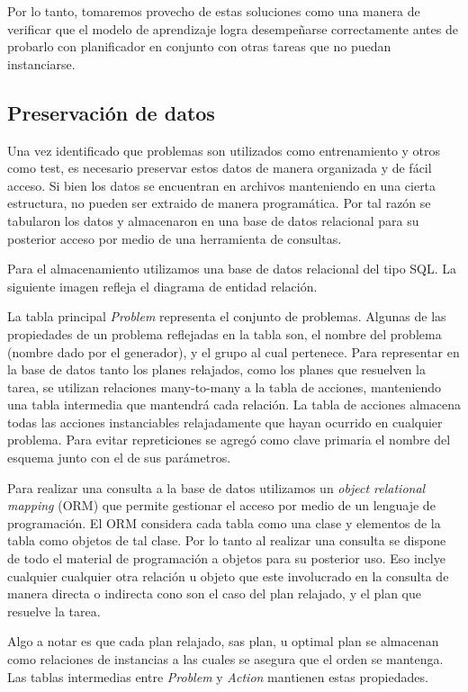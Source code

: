 Por lo tanto, tomaremos provecho de estas soluciones como una manera de
verificar que el modelo de aprendizaje logra desempeñarse correctamente antes de
probarlo con planificador en conjunto con otras tareas que no puedan
instanciarse.

\subsection{Preservación de datos}

Una vez identificado que problemas son utilizados como entrenamiento y otros
como test, es necesario preservar estos datos de manera organizada y de fácil
acceso. Si bien los datos se encuentran en archivos manteniendo en una cierta
estructura, no pueden ser extraido de manera programática. Por tal razón se
tabularon los datos y almacenaron en una base de datos relacional para su
posterior acceso por medio de una herramienta de consultas.

Para el almacenamiento utilizamos una base de datos relacional del tipo SQL. La
siguiente imagen refleja el diagrama de entidad relación.

La tabla principal \emph{Problem} representa el conjunto de problemas. Algunas
de las propiedades de un problema reflejadas en la tabla son, el nombre del
problema (nombre dado por el generador), y el grupo al cual pertenece. Para
representar en la base de datos tanto los planes relajados, como los planes que
resuelven la tarea, se utilizan relaciones many-to-many a la tabla de acciones,
manteniendo una tabla intermedia que mantendrá cada relación. La tabla de
acciones almacena todas las acciones instanciables relajadamente que hayan
ocurrido en cualquier problema. Para evitar repreticiones se agregó como clave
primaria el nombre del esquema junto con el de sus parámetros.

Para realizar una consulta a la base de datos utilizamos un \emph{object
relational mapping} (ORM) que permite gestionar el acceso por medio de un
lenguaje de programación. El ORM considera cada tabla como una clase y elementos
de la tabla como objetos de tal clase. Por lo tanto al realizar una consulta se
dispone de todo el material de programación a objetos para su posterior uso. Eso
inclye cualquier cualquier otra relación u objeto que este involucrado en la
consulta de manera directa o indirecta cono son el caso del plan relajado, y el
plan que resuelve la tarea.

Algo a notar es que cada plan relajado, sas plan, u optimal plan se almacenan
como relaciones de instancias a las cuales se asegura que el orden se mantenga.
Las tablas intermedias entre \emph{Problem} y \emph{Action} mantienen estas
propiedades.

